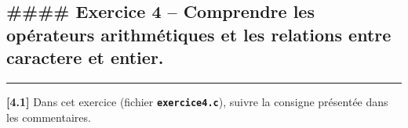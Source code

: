 \documentclass[11pt]{article}
\begin{document}
\hypertarget{exercice-4-comprendre-les-opuxe9rateurs-arithmuxe9tiques-et-les-relations-entre-caractere-et-entier.}{%
\subsection{\#\#\#\# Exercice 4 -- Comprendre les opérateurs
arithmétiques et les relations entre caractere et
entier.}\label{exercice-4-comprendre-les-opuxe9rateurs-arithmuxe9tiques-et-les-relations-entre-caractere-et-entier.}}

\begin{center}\rule{0.5\linewidth}{0.5pt}\end{center}

\textbf{{[}4.1{]}} Dans cet exercice (fichier
\textbf{\texttt{exercice4.c}}), suivre la consigne présentée dans les
commentaires.
\end{document}
